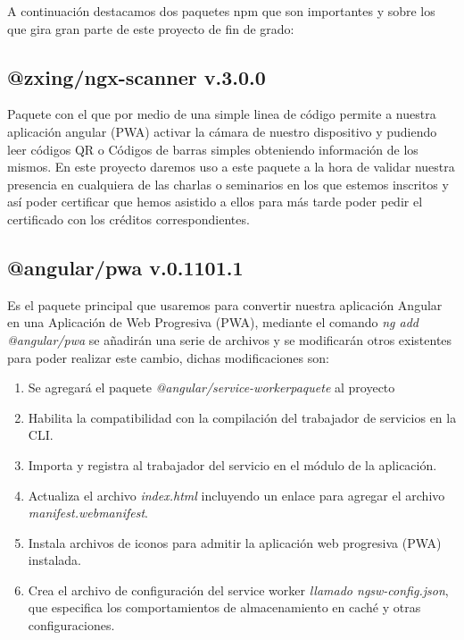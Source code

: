 \documentclass[a4paper, 12pt]{book}
\begin{document}
A continuación destacamos dos paquetes npm que son importantes y sobre los que gira gran parte de este proyecto de fin de grado:

\subsection{@zxing/ngx-scanner v.3.0.0}
\label{subsec:@zxing/ngx-scanner}
Paquete con el que por medio de una simple linea de código permite a nuestra aplicación angular (PWA) activar la cámara de nuestro dispositivo y pudiendo leer códigos QR o Códigos de barras simples obteniendo información de los mismos. 
	En este proyecto daremos uso a este paquete a la hora de validar nuestra presencia en cualquiera de las charlas o seminarios en los que estemos inscritos y así poder certificar que hemos asistido a ellos para más tarde poder pedir el certificado con los créditos correspondientes.

\subsection{@angular/pwa v.0.1101.1}
\label{subsec:@angular/pwa}
Es el paquete principal que usaremos para convertir nuestra aplicación Angular en una Aplicación de Web Progresiva (PWA), mediante el comando \textit{ng add @angular/pwa} se añadirán una serie de archivos y se modificarán otros existentes para poder realizar este cambio, dichas modificaciones son:

\begin{enumerate}
\item Se agregará el paquete \textit{@angular/service-workerpaquete} al proyecto

\item Habilita la compatibilidad con la compilación del trabajador de servicios en la CLI.

\item Importa y registra al trabajador del servicio en el módulo de la aplicación.

\item Actualiza el archivo \textit{index.html} incluyendo un enlace para agregar el archivo \textit{manifest.webmanifest}.

\item Instala archivos de iconos para admitir la aplicación web progresiva (PWA) instalada.

\item Crea el archivo de configuración del service worker \textit{llamado ngsw-config.json}, que especifica los comportamientos de almacenamiento en caché y otras configuraciones.
\end{enumerate}
\end{document}
